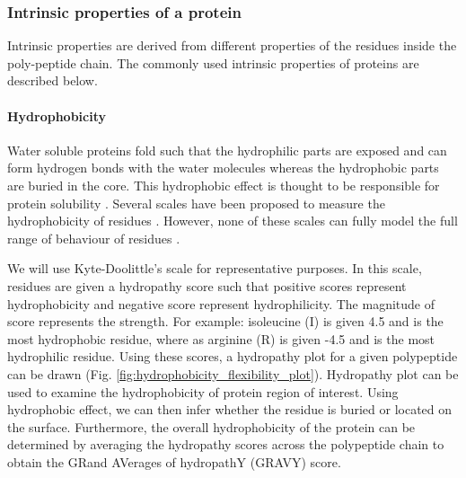 \subsubsection{Intrinsic properties of a protein}
Intrinsic properties are derived from different properties of the residues inside the poly-peptide chain. The commonly used intrinsic properties of proteins are described below.

\paragraph{Hydrophobicity}
Water soluble proteins fold such that the hydrophilic parts are exposed and can form hydrogen bonds with the water molecules whereas the hydrophobic parts are buried in the core. This hydrophobic effect is thought to be responsible for protein solubility \cite{tanford1978hydrophobic}. Several scales have been proposed to measure the hydrophobicity of residues \cite{Kyte1982-qn, abraham1987extension, janin1979surface, rose1985hydrophobicity}. However, none of these scales can fully model the full range of behaviour of residues \cite{charton1982structural}. 


We will use Kyte-Doolittle's scale \cite{Kyte1982-qn} for representative purposes. In this scale, residues are given a hydropathy score such that positive scores represent hydrophobicity and negative score represent hydrophilicity. The magnitude of score represents the strength. For example: isoleucine (I) is given 4.5 and is the most hydrophobic residue, where as  arginine (R) is given -4.5 and is the most hydrophilic residue. Using these scores, a hydropathy plot for a given polypeptide can be drawn (Fig. \ref{fig:hydrophobicity_flexibility_plot}). Hydropathy plot can be used to examine the hydrophobicity of protein region of interest. Using hydrophobic effect, we can then infer whether the residue is buried or located on the surface. Furthermore, the overall hydrophobicity of the protein can be determined by averaging the hydropathy scores across the polypeptide chain to obtain the GRand AVerages of hydropathY (GRAVY) score.


